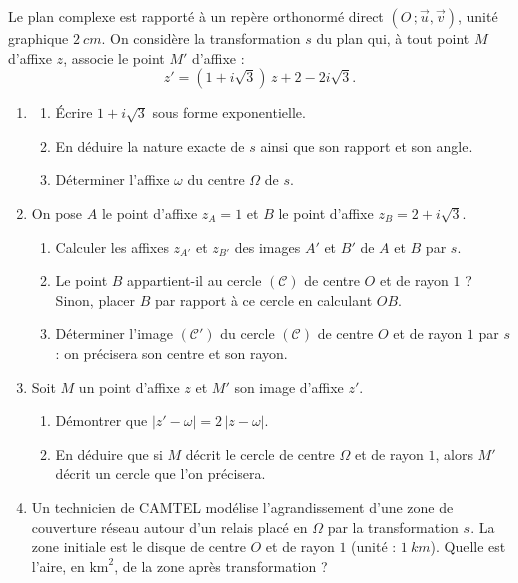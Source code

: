 \documentclass[11pt]{article}
\begin{document}
\begin{exercice}
Le plan complexe est rapporté à un repère orthonormé direct $(O\,;\vec{u},\vec{v})$, unité graphique $\SI{2}{cm}$. On considère la transformation $s$ du plan qui, à tout point $M$ d'affixe $z$, associe le point $M'$ d'affixe :
\[ z' = (1 + i\sqrt{3})\,z + 2 - 2i\sqrt{3}. \]
\begin{enumerate}
\item \begin{enumerate}
\item Écrire $1 + i\sqrt{3}$ sous forme exponentielle.
\item En déduire la nature exacte de $s$ ainsi que son rapport et son angle.
\item Déterminer l'affixe $\omega$ du centre $\Omega$ de $s$.
\end{enumerate}
\item On pose $A$ le point d'affixe $z_A = 1$ et $B$ le point d'affixe $z_B = 2 + i\sqrt{3}$.
\begin{enumerate}
\item Calculer les affixes $z_{A'}$ et $z_{B'}$ des images $A'$ et $B'$ de $A$ et $B$ par $s$.
\item Le point $B$ appartient-il au cercle $(\mathcal{C})$ de centre $O$ et de rayon $1$ ? Sinon, placer $B$ par rapport à ce cercle en calculant $OB$.
\item Déterminer l'image $(\mathcal{C}')$ du cercle $(\mathcal{C})$ de centre $O$ et de rayon $1$ par $s$ : on précisera son centre et son rayon.
\end{enumerate}
\item Soit $M$ un point d'affixe $z$ et $M'$ son image d'affixe $z'$.
\begin{enumerate}
\item Démontrer que $|z' - \omega| = 2\,|z - \omega|$.
\item En déduire que si $M$ décrit le cercle de centre $\Omega$ et de rayon $1$, alors $M'$ décrit un cercle que l'on précisera.
\end{enumerate}
\item Un technicien de CAMTEL modélise l'agrandissement d'une zone de couverture réseau autour d'un relais placé en $\Omega$ par la transformation $s$. La zone initiale est le disque de centre $O$ et de rayon $1$ (unité : $\SI{1}{km}$). Quelle est l'aire, en $\mathrm{km}^2$, de la zone après transformation ?
\end{enumerate}
\end{exercice}
\end{document}

